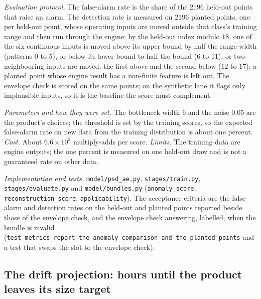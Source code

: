 \emph{Evaluation protocol.} The false-alarm rate is the share of the $2196$ held-out points that raise an alarm. The detection rate is measured on
$2196$ planted points, one per held-out point, whose operating inputs are moved outside that class's training range and then run through the
engine: by the held-out index modulo $18$, one of the six continuous inputs is moved above its upper bound by half the range width (patterns $0$ to
$5$), or below its lower bound to half the bound ($6$ to $11$), or two neighbouring inputs are moved, the first above and the second below ($12$ to
$17$); a planted point whose engine result has a non-finite feature is left out. The envelope check is scored on the same points; on the synthetic
lane it flags only implausible inputs, so it is the baseline the score must complement.

\emph{Parameters and how they were set.} The bottleneck width $6$ and the noise $0.05$ are the product's choices; the threshold is set by the
training scores, so the expected false-alarm rate on new data from the training distribution is about one percent. \emph{Cost.} About
$6.6\times10^{2}$ multiply-adds per score. \emph{Limits.} The training data are engine outputs; the one percent is measured on one held-out draw and
is not a guaranteed rate on other data.

\emph{Implementation and tests.} \texttt{model/\allowbreak{}psd\_ae.py}, \texttt{stages/\allowbreak{}train.py}, \texttt{stages/\allowbreak{}evaluate.py} and
\texttt{model/\allowbreak{}bundles.py} (\texttt{anomaly\_score}, \texttt{reconstruction\_score}, \texttt{applicability}). The acceptance criteria are the
false-alarm and detection rates on the held-out and planted points reported beside those of the envelope check, and the envelope check answering,
labelled, when the bundle is invalid (\texttt{test\_metrics\_report\_the\_anomaly\_comparison\_and\_the\_planted\_points} and a test that
swaps the slot to the envelope check).

\subsection{The drift projection: hours until the product leaves its size target}\label{sec:m-drift}

